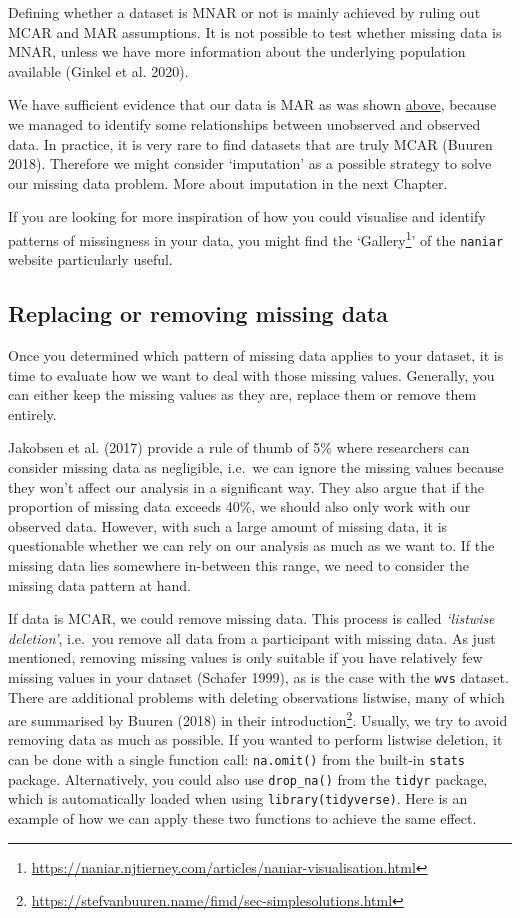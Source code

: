 \documentclass[
  letterpaper,
]{krantz}
\renewcommand{\href}[2]{#2\footnote{\url{#1}}}
\begin{document}
Defining whether a dataset is MNAR or not is mainly achieved by ruling
out MCAR and MAR assumptions. It is not possible to test whether missing
data is MNAR, unless we have more information about the underlying
population available (Ginkel et al. 2020).

We have sufficient evidence that our data is MAR as was shown
\hyperref[missing-at-random-mar]{above}, because we managed to identify
some relationships between unobserved and observed data. In practice, it
is very rare to find datasets that are truly MCAR (Buuren 2018).
Therefore we might consider `imputation' as a possible strategy to solve
our missing data problem. More about imputation in the next Chapter.

If you are looking for more inspiration of how you could visualise and
identify patterns of missingness in your data, you might find the
`\href{https://naniar.njtierney.com/articles/naniar-visualisation.html}{Gallery}'
of the \texttt{naniar} website particularly useful.

\subsection{Replacing or removing missing
data}\label{sec-replacing-removing-missing-data}

Once you determined which pattern of missing data applies to your
dataset, it is time to evaluate how we want to deal with those missing
values. Generally, you can either keep the missing values as they are,
replace them or remove them entirely.

Jakobsen et al. (2017) provide a rule of thumb of 5\% where researchers
can consider missing data as negligible, i.e.~we can ignore the missing
values because they won't affect our analysis in a significant way. They
also argue that if the proportion of missing data exceeds 40\%, we
should also only work with our observed data. However, with such a large
amount of missing data, it is questionable whether we can rely on our
analysis as much as we want to. If the missing data lies somewhere
in-between this range, we need to consider the missing data pattern at
hand.

If data is MCAR, we could remove missing data. This process is called
\emph{`listwise deletion'}, i.e.~you remove all data from a participant
with missing data. As just mentioned, removing missing values is only
suitable if you have relatively few missing values in your dataset
(Schafer 1999), as is the case with the \texttt{wvs} dataset. There are
additional problems with deleting observations listwise, many of which
are summarised by Buuren (2018) in their
\href{https://stefvanbuuren.name/fimd/sec-simplesolutions.html}{introduction}.
Usually, we try to avoid removing data as much as possible. If you
wanted to perform listwise deletion, it can be done with a single
function call: \texttt{na.omit()} from the built-in \texttt{stats}
package. Alternatively, you could also use \texttt{drop\_na()} from the
\texttt{tidyr} package, which is automatically loaded when using
\texttt{library(tidyverse)}. Here is an example of how we can apply
these two functions to achieve the same effect.
\end{document}
